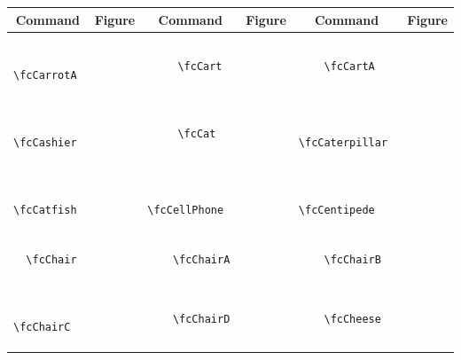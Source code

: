 \documentclass[x11names]{article}
\begin{document}
\begin{table}[H]\centering\begin{tabular}{|c|c|c|c|c|c|}\hline{\bf Command} & {\bf Figure} & {\bf Command} & {\bf Figure} & {\bf Command} & {\bf Figure}\\	\hline	&\multirow{5}{*}{	\fcCarrotA	[scale=0.16]} & &\multirow{5}{*}{	\fcCart	[scale=0.16]} & &\multirow{5}{*}{	\fcCartA	[scale=0.16]}\\	& & & & & \\	& & & & & \\	\verb|	\fcCarrotA	| & & \verb|	\fcCart	| & & \verb|	\fcCartA	| & \\	& & & & & \\	& & & & & \\	& & & & & \\	\hline									
		&\multirow{5}{*}{	\fcCashier	[scale=0.16]} & &\multirow{5}{*}{	\fcCat	[scale=0.64]} & &\multirow{5}{*}{	\fcCaterpillar	[scale=0.09]}\\	& & & & & \\	& & & & & \\	\verb|	\fcCashier	| & & \verb|	\fcCat	| & & \verb|	\fcCaterpillar	| & \\	& & & & & \\	& & & & & \\	& & & & & \\	\hline									
		&\multirow{5}{*}{	\fcCatfish	[scale=0.16]} & &\multirow{5}{*}{	\fcCellPhone	[scale=0.16]} & &\multirow{5}{*}{	\fcCentipede	[scale=0.36]}\\	& & & & & \\	& & & & & \\	\verb|	\fcCatfish	| & & \verb|	\fcCellPhone	| & & \verb|	\fcCentipede	| & \\	& & & & & \\	& & & & & \\	& & & & & \\	\hline									
		&\multirow{5}{*}{	\fcChair	[scale=0.16]} & &\multirow{5}{*}{	\fcChairA	[scale=0.16]} & &\multirow{5}{*}{	\fcChairB	[scale=0.16]}\\	& & & & & \\	& & & & & \\	\verb|	\fcChair	| & & \verb|	\fcChairA	| & & \verb|	\fcChairB	| & \\	& & & & & \\	& & & & & \\	& & & & & \\	\hline									
		&\multirow{5}{*}{	\fcChairC	[scale=0.09]} & &\multirow{5}{*}{	\fcChairD	[scale=0.09]} & &\multirow{5}{*}{	\fcCheese	[scale=0.16]}\\	& & & & & \\	& & & & & \\	\verb|	\fcChairC	| & & \verb|	\fcChairD	| & & \verb|	\fcCheese	| & \\	& & & & & \\	& & & & & \\	& & & & & \\	\hline									

\end{tabular}
\end{table}
\end{document}
